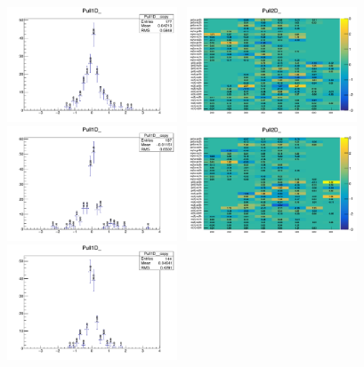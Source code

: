 \begin{figure}[h!]
  \centering
  \includegraphics[width=0.45\textwidth]{figures/btagformula/validation/TFValidationSingleMu_loose}~
  \includegraphics[width=0.45\textwidth]{figures/btagformula/validation/TFValidation2DSingleMu_loose} \\
  \includegraphics[width=0.45\textwidth]{figures/btagformula/validation/TFValidationSingleMu_medium}~
  \includegraphics[width=0.45\textwidth]{figures/btagformula/validation/TFValidation2DSingleMu_medium} \\
  \includegraphics[width=0.45\textwidth]{figures/btagformula/validation/TFValidationSingleMu_tight}~

\end{figure}
